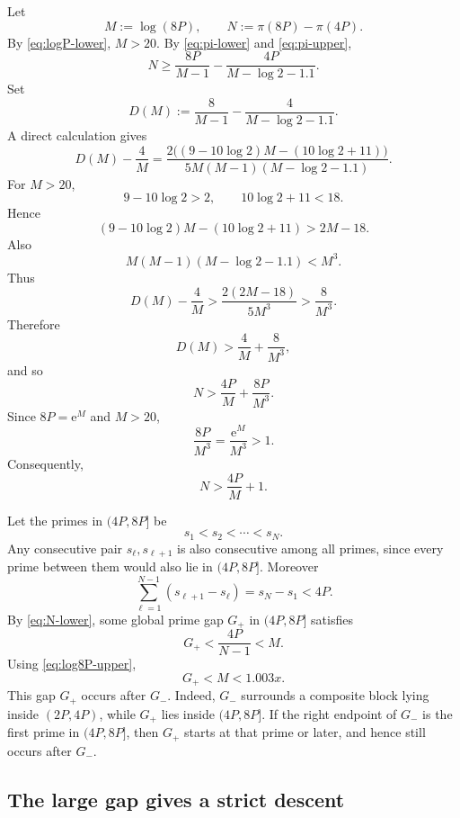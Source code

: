 \documentclass[11pt]{article}
\numberwithin{equation}{section}
\theoremstyle{plain}
\theoremstyle{definition}
\theoremstyle{remark}
\newcommand{\e}{\mathrm e}
\begin{document}
Let
\[
        M:=\log(8P),
        \qquad
        N:=\pi(8P)-\pi(4P).
\]
By \eqref{eq:logP-lower}, \(M>20\).  By \eqref{eq:pi-lower} and \eqref{eq:pi-upper},
\[
        N
        \ge
        \frac{8P}{M-1}
        -
        \frac{4P}{M-\log2-1.1}.
\]
Set
\[
        D(M):=\frac8{M-1}-\frac4{M-\log2-1.1}.
\]
A direct calculation gives
\[
        D(M)-\frac4M
        =
        \frac{
        2\bigl((9-10\log2)M-(10\log2+11)\bigr)
        }
        {
        5M(M-1)(M-\log2-1.1)
        }.
\]
For \(M>20\),
\[
        9-10\log2>2,
        \qquad
        10\log2+11<18.
\]
Hence
\[
        (9-10\log2)M-(10\log2+11)>2M-18.
\]
Also
\[
        M(M-1)(M-\log2-1.1)<M^3.
\]
Thus
\[
        D(M)-\frac4M
        >
        \frac{2(2M-18)}{5M^3}
        >
        \frac8{M^3}.
\]
Therefore
\[
        D(M)>\frac4M+\frac8{M^3},
\]
and so
\[
        N>\frac{4P}{M}+\frac{8P}{M^3}.
\]
Since \(8P=\e^M\) and \(M>20\),
\[
        \frac{8P}{M^3}=\frac{\e^M}{M^3}>1.
\]
Consequently,
\begin{equation}\label{eq:N-lower}
N>\frac{4P}{M}+1.
\end{equation}

Let the primes in \((4P,8P]\) be
\[
        s_1<s_2<\cdots<s_N.
\]
Any consecutive pair \(s_\ell,s_{\ell+1}\) is also consecutive among all primes, since every prime between them would also lie in \((4P,8P]\).  Moreover
\[
        \sum_{\ell=1}^{N-1}(s_{\ell+1}-s_\ell)
        =
        s_N-s_1
        <4P.
\]
By \eqref{eq:N-lower}, some global prime gap \(G_+\) in \((4P,8P]\) satisfies
\[
        G_+<\frac{4P}{N-1}<M.
\]
Using \eqref{eq:log8P-upper},
\begin{equation}\label{eq:Gplus-upper}
G_+<M<1.003x.
\end{equation}
This gap \(G_+\) occurs after \(G_-\).  Indeed, \(G_-\) surrounds a composite block lying inside \((2P,4P)\), while \(G_+\) lies inside \((4P,8P]\).  If the right endpoint of \(G_-\) is the first prime in \((4P,8P]\), then \(G_+\) starts at that prime or later, and hence still occurs after \(G_-\).

\subsection{The large gap gives a strict descent}
\end{document}
